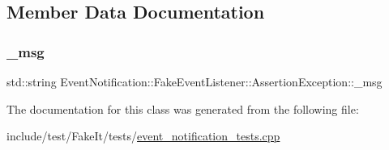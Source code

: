 \subsection{Member Data Documentation}
\mbox{\label{classEventNotification_1_1FakeEventListener_1_1AssertionException_a9b437435c5af2336d7d1018aa4ff7aea}} 
\subsubsection{\texorpdfstring{\_msg}{\_msg}}
{\footnotesize\ttfamily std\+::string Event\+Notification\+::\+Fake\+Event\+Listener\+::\+Assertion\+Exception\+::\+\_\+msg}



The documentation for this class was generated from the following file\+:\begin{DoxyCompactItemize}
\item 
include/test/\+Fake\+It/tests/\mbox{\hyperlink{event__notification__tests_8cpp}{event\+\_\+notification\+\_\+tests.\+cpp}}\end{DoxyCompactItemize}

